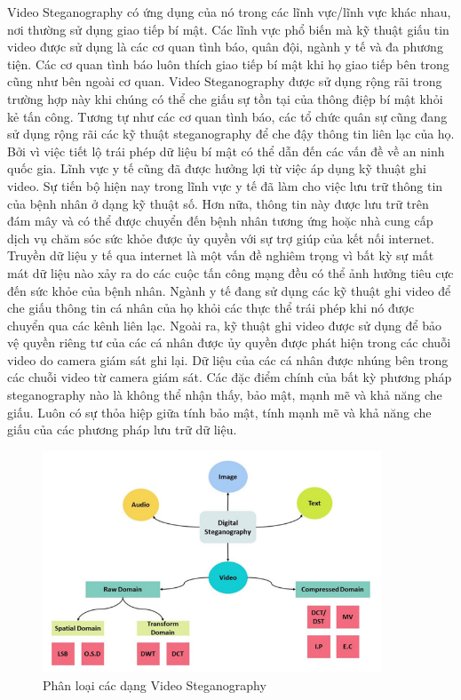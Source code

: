 Video Steganography có ứng dụng của nó trong các lĩnh vực/lĩnh vực khác nhau, nơi thường sử dụng giao tiếp bí mật. Các lĩnh vực phổ biến mà kỹ thuật giấu tin video được sử dụng là các cơ quan tình báo, quân đội, ngành y tế và đa phương tiện. Các cơ quan tình báo luôn thích giao tiếp bí mật khi họ giao tiếp bên trong cũng như bên ngoài cơ quan. Video Steganography được sử dụng rộng rãi trong trường hợp này khi chúng có thể che giấu sự tồn tại của thông điệp bí mật khỏi kẻ tấn công. Tương tự như các cơ quan tình báo, các tổ chức quân sự cũng đang sử dụng rộng rãi các kỹ thuật steganography để che đậy thông tin liên lạc của họ. Bởi vì việc tiết lộ trái phép dữ liệu bí mật có thể dẫn đến các vấn đề về an ninh quốc gia. Lĩnh vực y tế cũng đã được hưởng lợi từ việc áp dụng kỹ thuật ghi video. Sự tiến bộ hiện nay trong lĩnh vực y tế đã làm cho việc lưu trữ thông tin của bệnh nhân ở dạng kỹ thuật số. Hơn nữa, thông tin này được lưu trữ trên đám mây và có thể được chuyển đến bệnh nhân tương ứng hoặc nhà cung cấp dịch vụ chăm sóc sức khỏe được ủy quyền với sự trợ giúp của kết nối internet. Truyền dữ liệu y tế qua internet là một vấn đề nghiêm trọng vì bất kỳ sự mất mát dữ liệu nào xảy ra do các cuộc tấn công mạng đều có thể ảnh hưởng tiêu cực đến sức khỏe của bệnh nhân. Ngành y tế đang sử dụng các kỹ thuật ghi video để che giấu thông tin cá nhân của họ khỏi các thực thể trái phép khi nó được chuyển qua các kênh liên lạc. Ngoài ra, kỹ thuật ghi video được sử dụng để bảo vệ quyền riêng tư của các cá nhân được ủy quyền được phát hiện trong các chuỗi video do camera giám sát ghi lại. Dữ liệu của các cá nhân được nhúng bên trong các chuỗi video từ camera giám sát. Các đặc điểm chính của bất kỳ phương pháp steganography nào là không thể nhận thấy, bảo mật, mạnh mẽ và khả năng che giấu. Luôn có sự thỏa hiệp giữa tính bảo mật, tính mạnh mẽ và khả năng che giấu của các phương pháp lưu trữ dữ liệu.

\begin{figure}[!h]
    \centering
    \includegraphics[width=0.9\textwidth]{graphics/chapter-1/Classif_VideoSte.png}
    \caption{Phân loại các dạng Video Steganography}
    \label{fig:classifi}
\end{figure}


